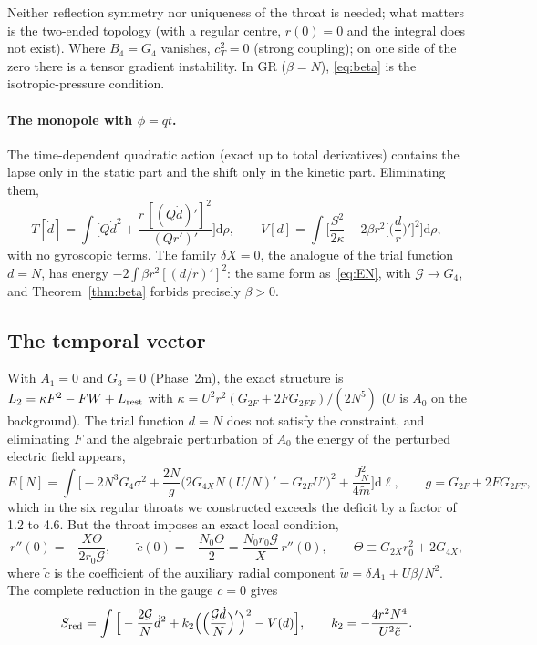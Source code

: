 \documentclass[11pt,a4paper]{article}
\theoremstyle{remark}
\newcommand{\G}{\mathcal G}
\newcommand{\dd}{\mathrm d}
\begin{document}
Neither reflection symmetry nor uniqueness of the throat is needed; what matters is the two-ended topology (with a regular centre, $r(0)=0$ and the integral does not exist). Where $B_4=G_4$ vanishes, $c_T^2=0$ (strong coupling); on one side of the zero there is a tensor gradient instability. In GR ($\beta=N$), \eqref{eq:beta} is the isotropic-pressure condition.

\paragraph{The monopole with $\phi=qt$.} The time-dependent quadratic action (exact up to total derivatives) contains the lapse only in the static part and the shift only in the kinetic part. Eliminating them,
\begin{equation}
T[\dot d]=\int\Big[Q\dot d^2+\frac{r\,[(Q\dot d)']^2}{(Qr')'}\Big]\dd\rho,\qquad
V[d]=\int\Big[\frac{S^2}{2\kappa}-2\beta r^2\Big[\Big(\frac dr\Big)'\Big]^2\Big]\dd\rho,
\label{eq:Tqt}
\end{equation}
with no gyroscopic terms. The family $\delta X=0$, the analogue of the trial function $d=N$, has energy $-2\int\beta r^2[(d/r)']^2$: the same form as~\eqref{eq:EN}, with $\G\to G_4$, and Theorem~\ref{thm:beta} forbids precisely $\beta>0$.

\subsection{The temporal vector}

With $A_1=0$ and $G_3=0$ (Phase~2m), the exact structure is $L_2=\kappa F^2-FW+L_{\rm rest}$ with $\kappa=U^2r^2(G_{2F}+2FG_{2FF})/(2N^5)$ ($U$ is $A_0$ on the background). The trial function $d=N$ does not satisfy the constraint, and eliminating $F$ and the algebraic perturbation of $A_0$ the energy of the perturbed electric field appears,
\begin{equation}
E[N]=\int\Big[-2N^3G_4\sigma^2+\frac{2N}{g}\big(2G_{4X}N(U/N)'-G_{2F}U'\big)^2+\frac{J_N^2}{4\tilde m}\Big]\dd\ell,\qquad g=G_{2F}+2FG_{2FF},
\end{equation}
which in the six regular throats we constructed exceeds the deficit by a factor of 1.2 to 4.6. But the throat imposes an exact local condition,
\begin{equation}
r''(0)=-\frac{X\Theta}{2r_0\G},\qquad \tilde c(0)=-\frac{N_0\Theta}{2}=\frac{N_0r_0\G}{X}\,r''(0),\qquad \Theta\equiv G_{2X}r_0^2+2G_{4X},
\end{equation}
where $\tilde c$ is the coefficient of the auxiliary radial component $\tilde w=\delta A_1+U\beta/N^2$. The complete reduction in the gauge $c=0$ gives
\begin{equation}
S_{\rm red}=\int\Big[-\frac{2\G}{N}\dot d^2+k_2\Big(\Big(\frac{\G\dot d}{N}\Big)'\Big)^2-V(d)\Big],\qquad k_2=-\frac{4r^2N^4}{U^2\tilde c}.
\end{equation}
\end{document}
